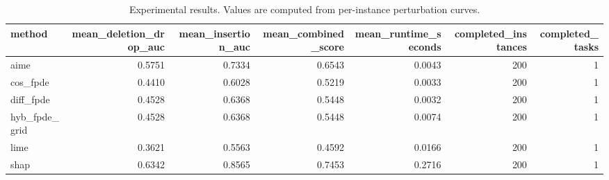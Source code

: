 \begin{table}[t]
\caption{Experimental results. Values are computed from per-instance perturbation curves.}
\label{tab:main_results_computed}
\centering
\begin{tabular}{lrrrrrr}
\toprule
method & mean\_deletion\_drop\_auc & mean\_insertion\_auc & mean\_combined\_score & mean\_runtime\_seconds & completed\_instances & completed\_tasks \\
\midrule
aime & 0.5751 & 0.7334 & 0.6543 & 0.0043 & 200 & 1 \\
cos\_fpde & 0.4410 & 0.6028 & 0.5219 & 0.0033 & 200 & 1 \\
diff\_fpde & 0.4528 & 0.6368 & 0.5448 & 0.0032 & 200 & 1 \\
hyb\_fpde\_grid & 0.4528 & 0.6368 & 0.5448 & 0.0074 & 200 & 1 \\
lime & 0.3621 & 0.5563 & 0.4592 & 0.0166 & 200 & 1 \\
shap & 0.6342 & 0.8565 & 0.7453 & 0.2716 & 200 & 1 \\
\bottomrule
\end{tabular}

\end{table}
